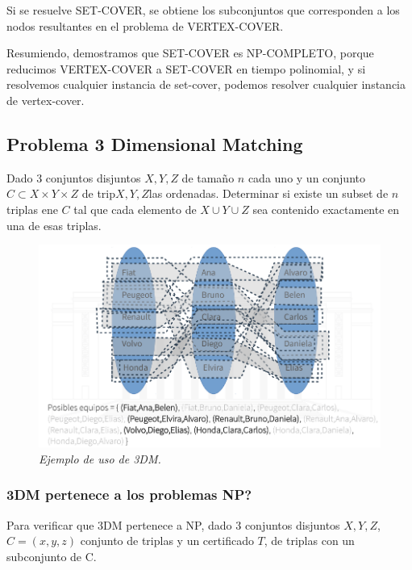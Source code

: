 \documentclass{article}
\begin{document}
Si se resuelve SET-COVER, se obtiene los subconjuntos que corresponden a los nodos resultantes en el 
problema de VERTEX-COVER.

Resumiendo, demostramos que SET-COVER es NP-COMPLETO, porque reducimos VERTEX-COVER a SET-COVER en tiempo
polinomial, y si resolvemos cualquier instancia de set-cover, podemos resolver cualquier instancia
de vertex-cover.

\newpage
\subsection{Problema 3 Dimensional Matching}

Dado 3 conjuntos disjuntos \(X, Y, Z\) de tamaño \(n\) 
cada uno y un conjunto \(C \subset X \times Y \times Z\) de trip\(X, Y, Z\)las ordenadas. Determinar si existe
un subset de \(n\) triplas ene \(C\) tal que cada elemento de \(X \cup Y \cup Z\) sea contenido
exactamente en una de esas triplas.

\begin{figure}[h!]
    \begin{center} 
    \includegraphics[width=\linewidth]{imagenes/ejemplo-3DM.png}
    \caption{\small \sl Ejemplo de uso de 3DM.\label{fig:ejm3dm}} 
    \end{center}
\end{figure}

\subsubsection{3DM pertenece a los problemas NP?}

Para verificar que 3DM pertenece a NP, dado 3 conjuntos disjuntos \(X, Y, Z\), \(C=(x,y,z)\) 
conjunto de triplas y un certificado \(T\), de triplas con un subconjunto de C.
\end{document}
